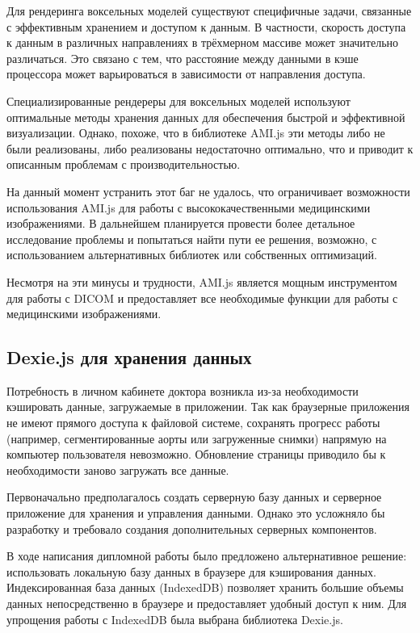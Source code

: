 Для рендеринга воксельных моделей существуют специфичные задачи, связанные с эффективным хранением и доступом к данным. В частности, скорость доступа к данным в различных направлениях в трёхмерном массиве может значительно различаться. Это связано с тем, что расстояние между данными в кэше процессора может варьироваться в зависимости от направления доступа.

Специализированные рендереры для воксельных моделей используют оптимальные методы хранения данных для обеспечения быстрой и эффективной визуализации. Однако, похоже, что в библиотеке AMI.js эти методы либо не были реализованы, либо реализованы недостаточно оптимально, что и приводит к описанным проблемам с производительностью.

На данный момент устранить этот баг не удалось, что ограничивает возможности использования AMI.js для работы с высококачественными медицинскими изображениями. В дальнейшем планируется провести более детальное исследование проблемы и попытаться найти пути ее решения, возможно, с использованием альтернативных библиотек или собственных оптимизаций.

Несмотря на эти минусы и трудности, AMI.js является мощным инструментом для работы с DICOM и предоставляет все необходимые функции для работы с медицинскими изображениями.

\subsection{Dexie.js для хранения данных}

Потребность в личном кабинете доктора возникла из-за необходимости кэшировать данные, загружаемые в приложении. Так как браузерные приложения не имеют прямого доступа к файловой системе, сохранять прогресс работы (например, сегментированные аорты или загруженные снимки) напрямую на компьютер пользователя невозможно. Обновление страницы приводило бы к необходимости заново загружать все данные.

Первоначально предполагалось создать серверную базу данных и серверное приложение для хранения и управления данными. Однако это усложняло бы разработку и требовало создания дополнительных серверных компонентов.

В ходе написания дипломной работы было предложено альтернативное решение: использовать локальную базу данных в браузере для кэширования данных. Индексированная база данных (IndexedDB) позволяет хранить большие объемы данных непосредственно в браузере и предоставляет удобный доступ к ним. Для упрощения работы с IndexedDB была выбрана библиотека Dexie.js.

